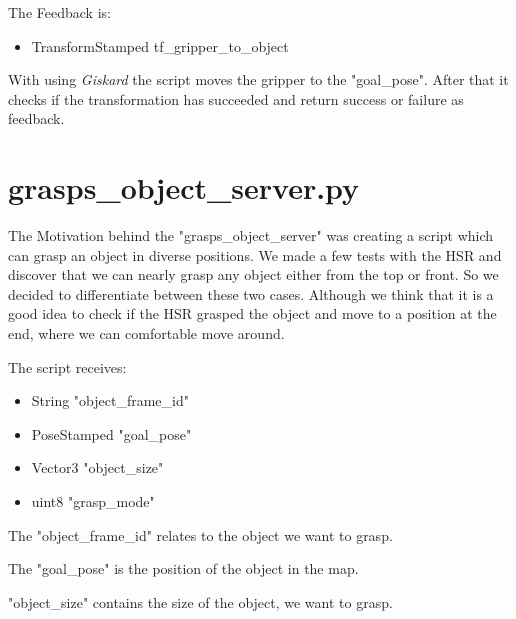 \documentclass[main.tex]{subfiles}
\begin{document}
     	\vspace{0,75 cm}
     	The Feedback is:
     	\begin{itemize}
     		\item TransformStamped tf\_gripper\_to\_object
     	\end{itemize}
	
		  \vspace{0,75 cm}
		With using \textit{Giskard} the script moves the gripper to the "goal\_pose". After that it checks if the transformation has succeeded and return success or failure as feedback.
		
		\newpage
		\section{grasps\_object\_server.py} 
		
			The Motivation behind the "grasps\_object\_server" was creating a script which can grasp an object in diverse positions. We made a few tests with the HSR and discover that we can nearly grasp any object either from the top or front. So we decided to differentiate between these two cases. Although we think that it is a good idea to check if the HSR grasped the object and move to a position at the end, where we can comfortable move around.
			
			The script receives: 
			\begin{itemize}
				\item String "object\_frame\_id"
				\item PoseStamped "goal\_pose"
				\item Vector3 "object\_size"
				\item uint8 "grasp\_mode"
			\end{itemize}
			
			\vspace{0,25 cm}
			The "object\_frame\_id" relates to the object we want to grasp.
		
			\vspace{0,25 cm}
			The "goal\_pose" is the position of the object in the map.

			\vspace{0,25 cm}
			"object\_size" contains the size of the object, we want to grasp.
			
\end{document}
